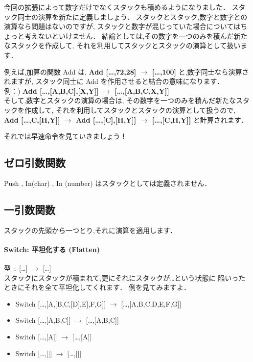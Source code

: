 今回の拡張によって数字だけでなくスタックも積めるようになりました．
スタック同士の演算を新たに定義しましょう．
スタックとスタック,数字と数字との演算なら問題はないのですが,
スタックと数字が混じっていた場合についてはちょっと考えないといけません．
結論としては,その数字を一つのみを積んだ新たなスタックを作成して,
それを利用してスタックとスタックの演算として扱います．

例えば,加算の関数 Add は, \textbf{Add {[}\ldots{},72,28{]}
$\to$ {[}\ldots{},100{]}} と,数字同士なら演算されますが,
スタック同士に Add を作用させると結合の意味になります．\\例：) \textbf{Add
{[}\ldots{},{[}A,B,C{]},{[}X,Y{]}{]} $\to$
{[}\ldots{},{[}A,B,C,X,Y{]}{]}}\\そして,数字とスタックの演算の場合は,
その数字を一つのみを積んだ新たなスタックを作成して,
それを利用してスタックとスタックの演算として扱うので, \textbf{Add
{[}\ldots{},C,{[}H,Y{]}{]} $\to$ Add
{[}\ldots{},{[}C{]},{[}H,Y{]}{]} $\to$
{[}\ldots{},{[}C,H,Y{]}{]}} と計算されます．

それでは早速命令を見ていきましょう！

\subsection{ゼロ引数関数}

Push , In(char) , In (number) はスタックとしては定義されません．

\subsection{一引数関数}

スタックの先頭から一つとり,それに演算を適用します．

\paragraph{Switch: 平坦化する (Flatten)}

型 :: {[}\ldots{}{]} $\to$
{[}\ldots{}{]}\\スタックにスタックが積まれて,更にそれにスタックが\ldots{}という状態に
陥いったときにそれを全て平坦化してくれます． 例を見てみますよ．

\begin{itemize}
\item
  Switch {[}\ldots{},{[}A,{[}B,C,{[}D{]},E{]},F,G{]}{]} $\to$
  {[}\ldots{},{[}A,B,C,D,E,F,G{]}{]}
\item
  Switch {[}\ldots{},{[}A,B,C{]}{]} $\to$
  {[}\ldots{},{[}A,B,C{]}{]}
\item
  Switch {[}\ldots{},{[}A{]}{]} $\to$ {[}\ldots{},{[}A{]}{]}
\item
  Switch {[}\ldots{},{[}{]}{]} $\to$ {[}\ldots{},{[}{]}{]}
\end{itemize}

